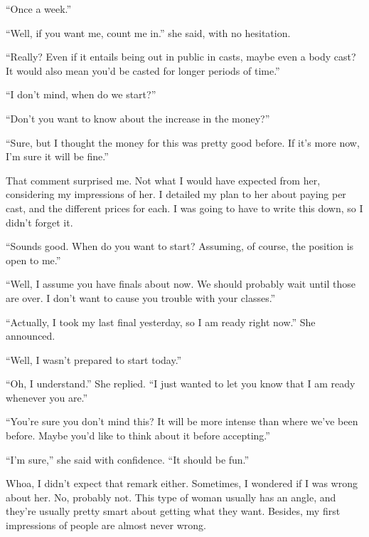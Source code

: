 ``Once a week.''

``Well, if you want me, count me in.'' she said, with no hesitation.

``Really? Even if it entails being out in public in casts, maybe even a body cast? It would
also mean you'd be casted for longer periods of time.''

``I don't mind, when do we start?''

``Don't you want to know about the increase in the money?''

``Sure, but I thought the money for this was pretty good before. If it's more now, I'm sure
it will be fine.''

That comment surprised me. Not what I would have expected from her, considering my
impressions of her. I detailed my plan to her about paying per cast, and the different prices
for each. I was going to have to write this down, so I didn't forget it.

``Sounds good. When do you want to start? Assuming, of course, the position is open to me.''

``Well, I assume you have finals about now. We should probably wait until those are over. I
don't want to cause you trouble with your classes.''

``Actually, I took my last final yesterday, so I am ready right now.'' She announced.

``Well, I wasn't prepared to start today.''

``Oh, I understand.'' She replied. ``I just wanted to let you know that I am ready whenever
you are.''

``You're sure you don't mind this? It will be more intense than where we've been before.
Maybe you'd like to think about it before accepting.''

``I'm sure,'' she said with confidence. ``It should be fun.''

Whoa, I didn't expect that remark either. Sometimes, I wondered if I was wrong about her.
No, probably not. This type of woman usually has an angle, and they're usually pretty smart
about getting what they want. Besides, my first impressions of people are almost never wrong.
